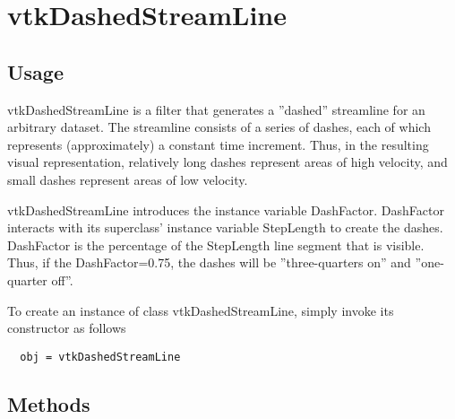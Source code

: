 \section{vtkDashedStreamLine}

\subsection{Usage}

 vtkDashedStreamLine is a filter that generates a ''dashed'' streamline for 
 an arbitrary dataset. The streamline consists of a series of dashes, each 
 of which represents (approximately) a constant time increment. Thus, in the
 resulting visual representation, relatively long dashes represent areas of 
 high velocity, and small dashes represent areas of low velocity.

 vtkDashedStreamLine introduces the instance variable DashFactor. 
 DashFactor interacts with its superclass' instance variable StepLength to
 create the dashes. DashFactor is the percentage of the StepLength line 
 segment that is visible. Thus, if the DashFactor=0.75, the dashes will be 
 ''three-quarters on'' and ''one-quarter off''.

To create an instance of class vtkDashedStreamLine, simply
invoke its constructor as follows
\begin{verbatim}
  obj = vtkDashedStreamLine
\end{verbatim}
\subsection{Methods}

